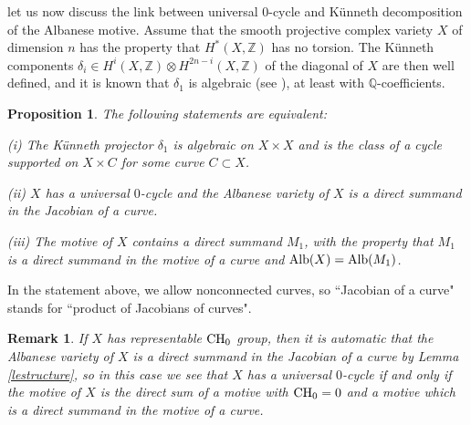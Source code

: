 \documentclass[10pt]{article}
\newtheorem{prop}[theo]{Proposition}
\newtheorem{rema}[theo]{Remark}
\begin{document}
let us now discuss the link between  universal $0$-cycle and Künneth decomposition of the Albanese motive. Assume that the    smooth projective complex variety $X$ of dimension $n$ has the property  that $H^*(X,\mathbb{Z})$ has no torsion. The K\"{u}nneth components $\delta_i\in H^i(X,\mathbb{Z})\otimes H^{2n-i}(X,\mathbb{Z})$ of the diagonal of $X$ are then well defined, and it is known that $\delta_1$ is algebraic (see \cite{murredec}), at least with $\mathbb{Q}$-coefficients.
\begin{prop} \label{prokununiv}The following statements are equivalent:

(i)  The K\"{u}nneth projector $\delta_1$ is algebraic on $X\times X$ and is the class of a cycle supported on $X\times C$ for some curve $C\subset X$.

(ii) $X$  has a universal $0$-cycle and the Albanese variety of $X$ is a direct summand in the Jacobian of a curve.

(iii) The motive of $X$ contains a direct summand $M_1$, with the property that $M_1$ is a direct summand in the motive of a curve and ${\rm Alb}(X)={\rm Alb}(M_1)$.

\end{prop}
In the statement above, we allow nonconnected curves, so ``Jacobian of a curve" stands for ``product of Jacobians of curves".
\begin{rema}{\rm If $X$ has representable ${\rm CH}_0$ group, then it is automatic that the Albanese variety of $X$ is a direct summand in the Jacobian of a curve by Lemma \ref{lestructure}, so in this case we see that $X$ has a universal $0$-cycle if and only if the motive of $X$ is the direct sum of a motive with  ${\rm CH}_0=0$ and a motive which is a direct summand in the motive of a curve.}
\end{rema}
\end{document}
